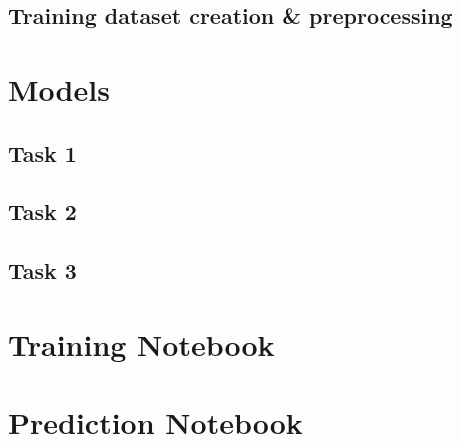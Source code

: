 \subsection{Training dataset creation \& preprocessing}
\label{train_data_generation}


\section{Models}
\subsection{Task 1}

\subsection{Task 2}

\subsection{Task 3}
\section{Training Notebook}

\section{Prediction Notebook}

